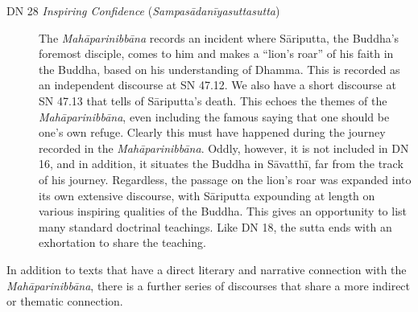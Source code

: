 \documentclass[12pt,openany]{book}%
\begin{document}
\begin{description}
\item[DN 28 \textit{Inspiring Confidence} (\textit{\textsanskrit{Sampasādanīyasuttasutta}})] The \textit{\textsanskrit{Mahāparinibbāna}} records an incident where \textsanskrit{Sāriputta}, the Buddha’s foremost disciple, comes to him and makes a “lion’s roar” of his faith in the Buddha, based on his understanding of Dhamma. This is recorded as an independent discourse at SN 47.12. We also have a short discourse at SN 47.13 that tells of \textsanskrit{Sāriputta}’s death. This echoes the themes of the \textit{\textsanskrit{Mahāparinibbāna}}, even including the famous saying that one should be one’s own refuge. Clearly this must have happened during the journey recorded in the \textit{\textsanskrit{Mahāparinibbāna}}. Oddly, however, it is not included in DN 16, and in addition, it situates the Buddha in \textsanskrit{Sāvatthī}, far from the track of his journey. Regardless, the passage on the lion’s roar was expanded into its own extensive discourse, with \textsanskrit{Sāriputta} expounding at length on various inspiring qualities of the Buddha. This gives an opportunity to list many standard doctrinal teachings. Like DN 18, the sutta ends with an exhortation to share the teaching.%
\end{description}

In addition to texts that have a direct literary and narrative connection with the \textit{\textsanskrit{Mahāparinibbāna}}, there is a further series of discourses that share a more indirect or thematic connection.
\end{document}
